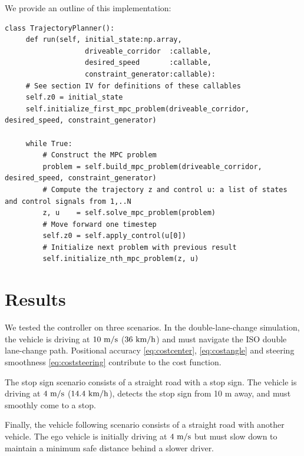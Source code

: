 \documentclass[letterpaper, 10 pt, conference]{ieeeconf}  %
\begin{document}
 We provide an outline of this implementation:
 \begin{lstlisting}[caption={Nonlinear MPC controller using proposed API.},style=Python]
 class TrajectoryPlanner():
     def run(self, initial_state:np.array,
                   driveable_corridor  :callable,
                   desired_speed       :callable,
                   constraint_generator:callable):
     # See section IV for definitions of these callables
     self.z0 = initial_state
     self.initialize_first_mpc_problem(driveable_corridor, desired_speed, constraint_generator)
 
     while True:
         # Construct the MPC problem
         problem = self.build_mpc_problem(driveable_corridor, desired_speed, constraint_generator)
         # Compute the trajectory z and control u: a list of states and control signals from 1,..N
         z, u    = self.solve_mpc_problem(problem)
         # Move forward one timestep
         self.z0 = self.apply_control(u[0])
         # Initialize next problem with previous result
         self.initialize_nth_mpc_problem(z, u)
 \end{lstlisting}
 
 
 
 \section{Results}
 We tested the controller on three scenarios. In the double-lane-change simulation, the vehicle is driving at $10\ \text{m}/\text{s}$ ($36\ \kmh$) and must navigate the ISO double lane-change path. Positional accuracy \eqref{eq:costcenter}, \eqref{eq:costangle} and steering smoothness \eqref{eq:coststeering} contribute to the cost function.
 
 The stop sign scenario consists of a straight road with a stop sign. The vehicle is driving at $4\ \text{m}/\text{s}$ ($14.4\ \text{km}/\text{h}$), detects the stop sign from 10 m away, and must smoothly come to a stop.
 
Finally, the vehicle following scenario consists of a straight road with another vehicle. The ego vehicle is initially driving at $4\ \text{m}/\text{s}$ but must slow down to maintain a minimum safe distance behind a slower driver.
\end{document}
